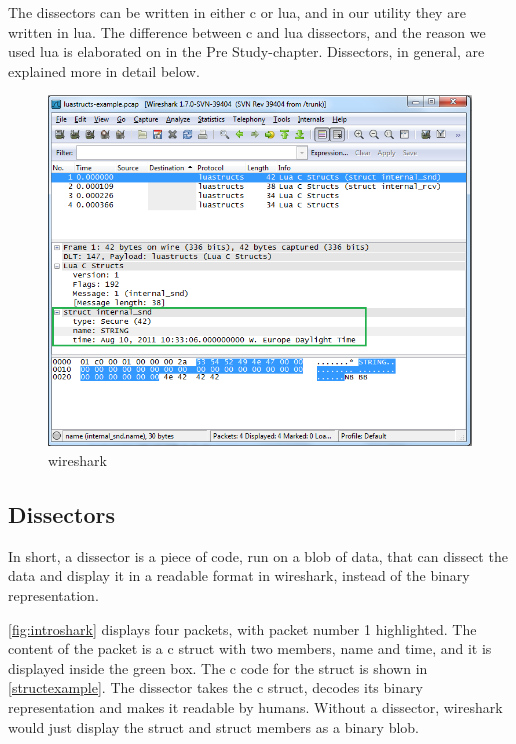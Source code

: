 The \glspl{dissector} can be written in either \Gls{c} or \Gls{lua}, and in our \gls{utility} they are written in \Gls{lua}.
The difference between \Gls{c} and \Gls{lua} \glspl{dissector}, and the reason we used \Gls{lua} is elaborated on in the Pre Study-chapter.
Dissectors, in general, are explained more in detail below.

\begin{figure}[ht]
	\includegraphics[width=\textwidth]{./img/wireshark_example.png}
	\caption{\Gls{wireshark}\label{fig:introshark}}
\end{figure}

\subsection*{Dissectors}
In short, a \gls{dissector} is a piece of code, run on a blob of data, that can dissect the
data and display it in a readable format in \Gls{wireshark}, instead of the \gls{binary} representation.

\autoref{fig:introshark} displays four \glspl{packet}, with \gls{packet} number 1 highlighted.
The content of the \gls{packet} is a \Gls{c} \gls{struct} with two \glspl{member}, name and time, and it is displayed inside the green box.
The \Gls{c} code for the \gls{struct} is shown in \autoref{structexample}.
The \gls{dissector} takes the \Gls{c} \gls{struct}, decodes its \gls{binary} representation and makes it readable by humans.
Without a \gls{dissector}, \Gls{wireshark} would just display the \gls{struct} and \gls{struct} \glspl{member} as a \gls{binary} blob.

